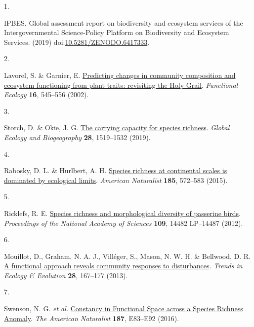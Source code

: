 \documentclass[
  10pt,
]{article}
\newlength{\cslhangindent}
\newlength{\csllabelwidth}
\newlength{\cslentryspacingunit} %
\newenvironment{CSLReferences}[2] %
 {%
  \setlength{\parindent}{0pt}
  \ifodd #1
  \let\oldpar\par
  \def\par{\hangindent=\cslhangindent\oldpar}
  \fi
  \setlength{\parskip}{#2\cslentryspacingunit}
 }%
 {}
\newcommand{\CSLLeftMargin}[1]{\parbox[t]{\csllabelwidth}{#1}}
\newcommand{\CSLRightInline}[1]{\parbox[t]{\linewidth - \csllabelwidth}{#1}\break}
\begin{document}
\hypertarget{refs}{}
\begin{CSLReferences}{0}{0}
\leavevmode{}%
\CSLLeftMargin{1. }
\CSLRightInline{IPBES. {Global assessment report on biodiversity and ecosystem services of the Intergovernmental Science-Policy Platform on Biodiversity and Ecosystem Services}. (2019) doi:\href{https://doi.org/10.5281/ZENODO.6417333}{10.5281/ZENODO.6417333}.}

\leavevmode{}%
\CSLLeftMargin{2. }
\CSLRightInline{Lavorel, S. \& Garnier, E. \href{https://doi.org/10.1046/J.1365-2435.2002.00664.X}{{Predicting changes in community composition and ecosystem functioning from plant traits: revisiting the Holy Grail}}. \emph{Functional Ecology} \textbf{16}, 545--556 (2002).}

\leavevmode{}%
\CSLLeftMargin{3. }
\CSLRightInline{Storch, D. \& Okie, J. G. \href{https://doi.org/10.1111/geb.12987}{{The carrying capacity for species richness}}. \emph{Global Ecology and Biogeography} \textbf{28}, 1519--1532 (2019).}

\leavevmode{}%
\CSLLeftMargin{4. }
\CSLRightInline{Rabosky, D. L. \& Hurlbert, A. H. \href{https://doi.org/10.1086/680850/ASSET/IMAGES/LARGE/FG3.JPEG}{{Species richness at continental scales is dominated by ecological limits}}. \emph{American Naturalist} \textbf{185}, 572--583 (2015).}

\leavevmode{}%
\CSLLeftMargin{5. }
\CSLRightInline{Ricklefs, R. E. \href{https://doi.org/10.1073/pnas.1212079109}{{Species richness and morphological diversity of passerine birds}}. \emph{Proceedings of the National Academy of Sciences} \textbf{109}, 14482 LP--14487 (2012).}

\leavevmode{}%
\CSLLeftMargin{6. }
\CSLRightInline{Mouillot, D., Graham, N. A. J., Villéger, S., Mason, N. W. H. \& Bellwood, D. R. \href{https://doi.org/10.1016/j.tree.2012.10.004}{{A functional approach reveals community responses to disturbances}}. \emph{Trends in Ecology \& Evolution} \textbf{28}, 167--177 (2013).}

\leavevmode{}%
\CSLLeftMargin{7. }
\CSLRightInline{Swenson, N. G. \emph{et al.} \href{https://doi.org/10.1086/685083}{{Constancy in Functional Space across a Species Richness Anomaly}}. \emph{The American Naturalist} \textbf{187}, E83--E92 (2016).}


\end{CSLReferences}
\end{document}
